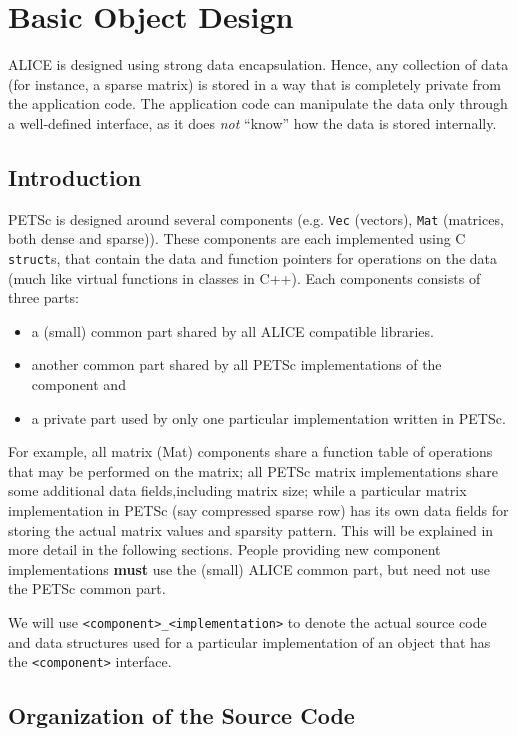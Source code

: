 \documentclass[twoside,12pt]{../sty/report_petsc}
\begin{document}
\chapter{Basic Object Design}
\label{chapter:design}

ALICE is designed using strong data encapsulation.  Hence,
any collection of data (for instance, a sparse matrix) is stored in 
a way that is completely private from the application code. The application 
code can manipulate the data only through a well-defined interface, as it 
does {\em not} ``know'' how the data is stored internally. 

\section{Introduction}

PETSc is designed around several components (e.g. {\tt Vec} (vectors),
{\tt Mat} (matrices, both dense and sparse)). These components are each 
implemented using C {\tt struct}s, that contain the data and function pointers
for operations on the data (much like virtual functions in classes in C++). 
Each components consists of three parts: 
\begin{itemize}
\item a (small) common part shared by all ALICE compatible libraries.
\item another common part shared by all PETSc implementations of the component and
\item a private part used by only one particular implementation written in PETSc.
\end{itemize}
For example, all matrix (Mat) components share a function table of operations that 
may be performed on the matrix; all PETSc matrix implementations share some additional
data fields,including matrix size; while a particular matrix implementation in PETSc
(say compressed sparse row) has its own data fields for storing the actual
matrix values and sparsity pattern. This will be explained in more detail
in the following sections. People providing new component implementations {\bf must}
use the (small) ALICE common
part, but need not use the PETSc common part.

We will use {\tt <component>\_<implementation>} to denote the actual source code and 
data structures used for a particular implementation of an object that has the 
{\tt <component>} interface.

\section{Organization of the Source Code}
\end{document}
